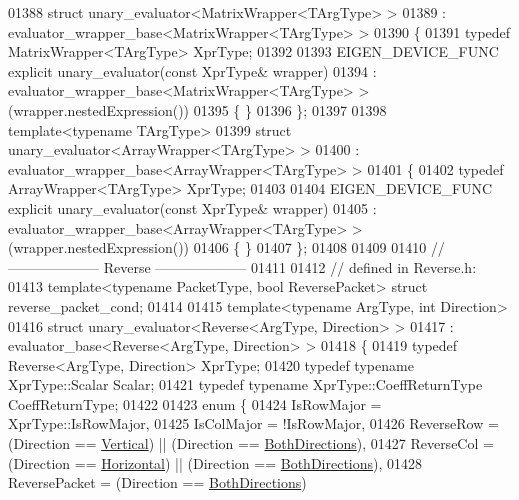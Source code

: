 \begin{DoxyCode}
01388 \textcolor{keyword}{struct }unary\_evaluator<MatrixWrapper<TArgType> >
01389   : evaluator\_wrapper\_base<MatrixWrapper<TArgType> >
01390 \{
01391   \textcolor{keyword}{typedef} MatrixWrapper<TArgType> XprType;
01392 
01393   EIGEN\_DEVICE\_FUNC \textcolor{keyword}{explicit} unary\_evaluator(\textcolor{keyword}{const} XprType& wrapper)
01394     : evaluator\_wrapper\_base<MatrixWrapper<TArgType> >(wrapper.nestedExpression())
01395   \{ \}
01396 \};
01397 
01398 \textcolor{keyword}{template}<\textcolor{keyword}{typename} TArgType>
01399 \textcolor{keyword}{struct }unary\_evaluator<ArrayWrapper<TArgType> >
01400   : evaluator\_wrapper\_base<ArrayWrapper<TArgType> >
01401 \{
01402   \textcolor{keyword}{typedef} ArrayWrapper<TArgType> XprType;
01403 
01404   EIGEN\_DEVICE\_FUNC \textcolor{keyword}{explicit} unary\_evaluator(\textcolor{keyword}{const} XprType& wrapper)
01405     : evaluator\_wrapper\_base<ArrayWrapper<TArgType> >(wrapper.nestedExpression())
01406   \{ \}
01407 \};
01408 
01409 
01410 \textcolor{comment}{// -------------------- Reverse --------------------}
01411 
01412 \textcolor{comment}{// defined in Reverse.h:}
01413 \textcolor{keyword}{template}<\textcolor{keyword}{typename} PacketType, \textcolor{keywordtype}{bool} ReversePacket> \textcolor{keyword}{struct }reverse\_packet\_cond;
01414 
01415 \textcolor{keyword}{template}<\textcolor{keyword}{typename} ArgType, \textcolor{keywordtype}{int} Direction>
01416 \textcolor{keyword}{struct }unary\_evaluator<Reverse<ArgType, Direction> >
01417   : evaluator\_base<Reverse<ArgType, Direction> >
01418 \{
01419   \textcolor{keyword}{typedef} Reverse<ArgType, Direction> XprType;
01420   \textcolor{keyword}{typedef} \textcolor{keyword}{typename} XprType::Scalar Scalar;
01421   \textcolor{keyword}{typedef} \textcolor{keyword}{typename} XprType::CoeffReturnType CoeffReturnType;
01422 
01423   \textcolor{keyword}{enum} \{
01424     IsRowMajor = XprType::IsRowMajor,
01425     IsColMajor = !IsRowMajor,
01426     ReverseRow = (Direction == \hyperlink{group__enums_ggad49a7b3738e273eb00932271b36127f7addca718e0564723df21d61b94b1198be}{Vertical})   || (Direction == 
      \hyperlink{group__enums_ggad49a7b3738e273eb00932271b36127f7aa01e40fce022901560ce6d9fdee2fde3}{BothDirections}),
01427     ReverseCol = (Direction == \hyperlink{group__enums_ggad49a7b3738e273eb00932271b36127f7aae8a16b3b9272683c1162915f6d892be}{Horizontal}) || (Direction == 
      \hyperlink{group__enums_ggad49a7b3738e273eb00932271b36127f7aa01e40fce022901560ce6d9fdee2fde3}{BothDirections}),
01428     ReversePacket = (Direction == \hyperlink{group__enums_ggad49a7b3738e273eb00932271b36127f7aa01e40fce022901560ce6d9fdee2fde3}{BothDirections})

\end{DoxyCode}
